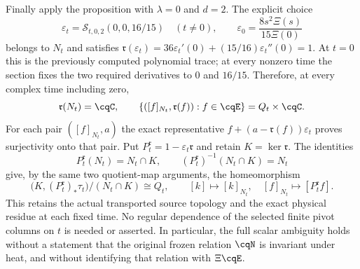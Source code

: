 Finally apply the proposition with $\lambda=0$ and $d=2$.
The explicit choice
\begin{equation}
 \varepsilon_t=\mathcal S_{t,0,2}(0,0,16/15)\quad(t\ne0),
 \qquad \varepsilon_0=\frac{8s^2\Xi(s)}{15\Xi(0)}
 \label{eq:cq-moving-residue-section}
\end{equation}
belongs to $N_t$ and satisfies
$\mathfrak r(\varepsilon_t)
 =36\varepsilon_t'(0)+(15/16)\varepsilon_t''(0)=1$.
At $t=0$ this is the previously computed polynomial trace;
at every nonzero time the section fixes the two required
derivatives to $0$ and $16/15$. Therefore, at every complex
time including zero,
\begin{equation}
 \mathfrak r(N_t)=\cqC,\qquad
 \{([f]_{N_t},\mathfrak r(f)):f\in\cqE\}
      =Q_t\times\cqC.
 \label{eq:cq-all-times-residue-ambiguity}
\end{equation}
For each pair $([f]_{N_t},a)$ the exact representative
$f+(a-\mathfrak r(f))\varepsilon_t$ proves surjectivity onto that
pair. Put $P_t^{\mathfrak r}=1-\varepsilon_t\mathfrak r$ and
retain $K=\ker\mathfrak r$. The identities
\[
 P_t^{\mathfrak r}(N_t)=N_t\cap K,
 \qquad (P_t^{\mathfrak r})^{-1}(N_t\cap K)=N_t
\]
give, by the same two quotient-map arguments, the homeomorphism
\begin{equation}
 \bigl(K,(P_t^{\mathfrak r})_*\tau_t\bigr)/(N_t\cap K)
      \cong Q_t,
 \qquad [k]\mapsto[k]_{N_t},\quad
 [f]_{N_t}\mapsto[P_t^{\mathfrak r}f].
 \label{eq:cq-all-times-residue-source-quotient}
\end{equation}
This retains the actual transported source topology and
the exact physical residue at each fixed time. No
regular dependence of the selected finite pivot columns
on $t$ is needed or asserted. In particular, the full
scalar ambiguity holds without a statement that the
original frozen relation $\cqN$ is invariant under heat,
and without identifying that relation with $\Xi\cqE$.
